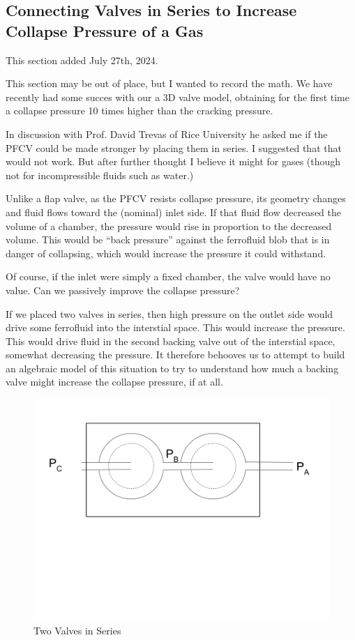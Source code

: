 \documentclass{asme2ej}
\begin{document}
\subsection{ Connecting Valves in Series to Increase Collapse Pressure of a Gas}

This section added July 27th, 2024.

This section may be out of place, but I wanted to record the math.
We have recently had some succes with our a 3D valve model, obtaining
for the first time a collapse pressure 10 times higher than the cracking
pressure.

In discussion with Prof. David Trevas of Rice University he asked me
if the PFCV could be made stronger by placing them in series.
I suggested that that would not work. But after further thought I
believe it might for gases (though not for incompressible fluids such as water.)

Unlike a flap valve, as the PFCV resists collapse pressure, its
geometry changes and fluid flows toward the (nominal) inlet side.
If that fluid flow decreased the volume of a chamber, the pressure
would rise in proportion to the decreased volume. This would be
``back pressure'' against the ferrofluid blob that is in danger
of collapsing, which would increase the pressure it could withstand.

Of course, if the inlet were simply a fixed chamber, the valve
would have no value. Can we passively improve the collapse pressure?

If we placed two valves in series, then high pressure on the outlet
side would drive some ferrofluid into the interstial space.
This would increase the pressure. This would drive fluid in the second
backing valve out
of the interstial space, somewhat decreasing the pressure.
It therefore behooves us to attempt to build an algebraic model of this
situation to try to understand how much a backing valve might
increase the collapse pressure, if at all.


\begin{figure}
\centerline{\includegraphics[width=6in]{figure/TwoValvesInSeries.png}}
\caption{Two Valves in Series}
\label{fig:Series}
\end{figure}
\end{document}
